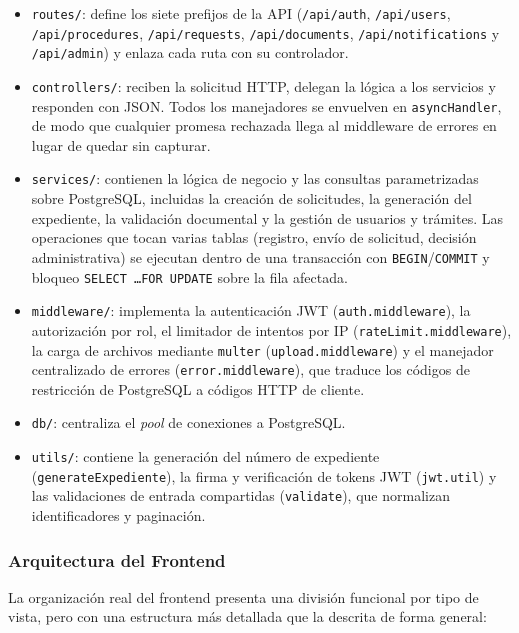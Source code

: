 \begin{itemize}
    \item \texttt{routes/}: define los siete prefijos de la API
    (\texttt{/api/auth}, \texttt{/api/users}, \texttt{/api/procedures},
    \texttt{/api/requests}, \texttt{/api/documents},
    \texttt{/api/notifications} y \texttt{/api/admin}) y enlaza cada ruta
    con su controlador.
    \item \texttt{controllers/}: reciben la solicitud HTTP, delegan la
    lógica a los servicios y responden con JSON. Todos los manejadores se
    envuelven en \texttt{asyncHandler}, de modo que cualquier promesa
    rechazada llega al middleware de errores en lugar de quedar sin capturar.
    \item \texttt{services/}: contienen la lógica de negocio y las
    consultas parametrizadas sobre PostgreSQL, incluidas la creación de
    solicitudes, la generación del expediente, la validación documental y la
    gestión de usuarios y trámites. Las operaciones que tocan varias tablas
    (registro, envío de solicitud, decisión administrativa) se ejecutan
    dentro de una transacción con \texttt{BEGIN}/\texttt{COMMIT} y bloqueo
    \texttt{SELECT \ldots FOR UPDATE} sobre la fila afectada.
    \item \texttt{middleware/}: implementa la autenticación JWT
    (\texttt{auth.middleware}), la autorización por rol, el limitador de
    intentos por IP (\texttt{rateLimit.middleware}), la carga de archivos
    mediante \texttt{multer} (\texttt{upload.middleware}) y el manejador
    centralizado de errores (\texttt{error.middleware}), que traduce los
    códigos de restricción de PostgreSQL a códigos HTTP de cliente.
    \item \texttt{db/}: centraliza el \emph{pool} de conexiones a PostgreSQL.
    \item \texttt{utils/}: contiene la generación del número de expediente
    (\texttt{generateExpediente}), la firma y verificación de tokens JWT
    (\texttt{jwt.util}) y las validaciones de entrada compartidas
    (\texttt{validate}), que normalizan identificadores y paginación.
\end{itemize}

\subsubsection{Arquitectura del Frontend}
La organización real del frontend presenta una división funcional por tipo de
vista, pero con una estructura más detallada que la descrita de forma general:

